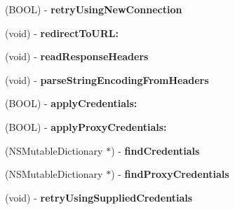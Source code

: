\begin{DoxyCompactItemize}
\item 
\hypertarget{interface_a_s_i_h_t_t_p_request_a36757b13199ccb943ca216f9723ba5e1}{
(\-B\-O\-O\-L) -\/ {\bfseries retry\-Using\-New\-Connection}}
\label{interface_a_s_i_h_t_t_p_request_a36757b13199ccb943ca216f9723ba5e1}

\item 
\hypertarget{interface_a_s_i_h_t_t_p_request_aed0a9ab6a8ca190bb26bb249c2a4ea50}{
(void) -\/ {\bfseries redirect\-To\-U\-R\-L\-:}}
\label{interface_a_s_i_h_t_t_p_request_aed0a9ab6a8ca190bb26bb249c2a4ea50}

\item 
\hypertarget{interface_a_s_i_h_t_t_p_request_abf63487739ee540915b40d3cace04c63}{
(void) -\/ {\bfseries read\-Response\-Headers}}
\label{interface_a_s_i_h_t_t_p_request_abf63487739ee540915b40d3cace04c63}

\item 
\hypertarget{interface_a_s_i_h_t_t_p_request_a4820891389ebf2eda587ff809b0e6bc2}{
(void) -\/ {\bfseries parse\-String\-Encoding\-From\-Headers}}
\label{interface_a_s_i_h_t_t_p_request_a4820891389ebf2eda587ff809b0e6bc2}

\item 
\hypertarget{interface_a_s_i_h_t_t_p_request_ade60b6e81c57c8ee8b616200ccb22930}{
(\-B\-O\-O\-L) -\/ {\bfseries apply\-Credentials\-:}}
\label{interface_a_s_i_h_t_t_p_request_ade60b6e81c57c8ee8b616200ccb22930}

\item 
\hypertarget{interface_a_s_i_h_t_t_p_request_a53e09e81268eb7230b4b5498ed2eb7d1}{
(\-B\-O\-O\-L) -\/ {\bfseries apply\-Proxy\-Credentials\-:}}
\label{interface_a_s_i_h_t_t_p_request_a53e09e81268eb7230b4b5498ed2eb7d1}

\item 
\hypertarget{interface_a_s_i_h_t_t_p_request_af337cbd50189506479260c6069ca2ded}{
(\-N\-S\-Mutable\-Dictionary $\ast$) -\/ {\bfseries find\-Credentials}}
\label{interface_a_s_i_h_t_t_p_request_af337cbd50189506479260c6069ca2ded}

\item 
\hypertarget{interface_a_s_i_h_t_t_p_request_aee0699cfb5ba5749a1461dfa56440121}{
(\-N\-S\-Mutable\-Dictionary $\ast$) -\/ {\bfseries find\-Proxy\-Credentials}}
\label{interface_a_s_i_h_t_t_p_request_aee0699cfb5ba5749a1461dfa56440121}

\item 
\hypertarget{interface_a_s_i_h_t_t_p_request_aad1efa3b1bc64006cc033bd0d4eee7cc}{
(void) -\/ {\bfseries retry\-Using\-Supplied\-Credentials}}
\label{interface_a_s_i_h_t_t_p_request_aad1efa3b1bc64006cc033bd0d4eee7cc}


\end{DoxyCompactItemize}
